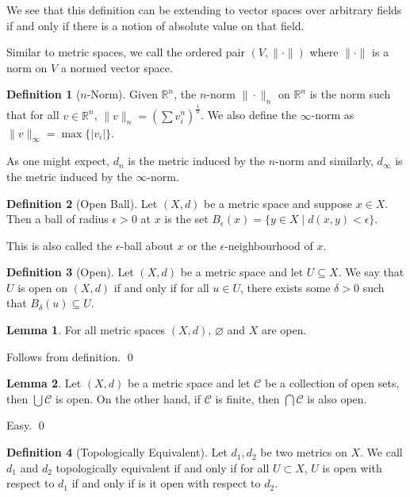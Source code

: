 \documentclass[
]{article}
\theoremstyle{definition}
\theoremstyle{definition}
\newtheorem{definition}{Definition}[section]
\newtheorem{lemma}{Lemma}[section]
\begin{document}
We see that this definition can be extending to vector spaces over
arbitrary fields if and only if there is a notion of absolute value on
that field.

Similar to metric spaces, we call the ordered pair \((V, \|\cdot\|)\)
where \(\|\cdot\|\) is a norm on \(V\) a normed vector space.

\begin{definition}[\(n\)-Norm]
  Given \(\mathbb{R}^n\), the \(n\)-norm \(\| \cdot \|_n\) on \(\mathbb{R}^n\) is 
  the norm such that for all \(v \in \mathbb{R}^n\), 
  \(\|v\|_n = \left(\sum v_i^n \right)^{\frac{1}{n}}\). We also define the 
  \(\infty\)-norm as \(\|v\|_\infty = \max\{\left|v_i\right|\}\).
\end{definition}

As one might expect, \(d_n\) is the metric induced by the \(n\)-norm and
similarly, \(d_\infty\) is the metric induced by the \(\infty\)-norm.

\begin{definition}[Open Ball]
  Let \((X, d)\) be a metric space and suppose \(x \in X\). Then a ball 
  of radius \(\epsilon > 0\) at \(x\) is the set 
  \(B_\epsilon(x) = \{y \in X \mid d(x, y) < \epsilon\}.\)
\end{definition}

This is also called the \(\epsilon\)-ball about \(x\) or the
\(\epsilon\)-neighbourhood of \(x\).

\begin{definition}[Open]
  Let \((X, d)\) be a metric space and let \(U \subseteq X\). We say that \(U\) 
  is open on \((X, d)\) if and only if for all \(u \in U\), there exists some 
  \(\delta > 0\) such that \(B_\delta(u) \subseteq U\).
\end{definition}

\begin{lemma}
  For all metric spaces \((X, d)\), \(\varnothing\) and \(X\) are open.
\end{lemma}
\proof

Follows from definition. \qed

\begin{lemma}
  Let \((X, d)\) be a metric space and let \(\mathcal{C}\) be a collection of 
  open sets, then \(\bigcup \mathcal{C}\) is open. On the other hand, if 
  \(\mathcal{C}\) is finite, then \(\bigcap\mathcal{C}\) is also open.
\end{lemma}
\proof

Easy. \qed

\begin{definition}[Topologically Equivalent]
  Let \(d_1, d_2\) be two metrics on \(X\). We call \(d_1\) and \(d_2\) 
  topologically equivalent if and only if for all \(U \subset X\), \(U\) is open
  with respect to \(d_1\) if and only if is it open with respect to \(d_2\).
\end{definition}
\end{document}
